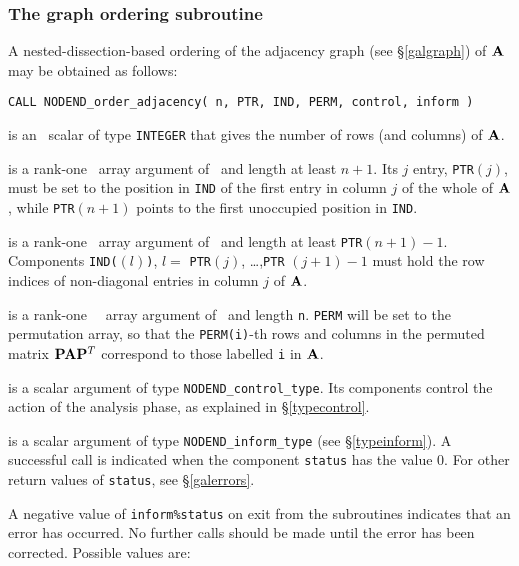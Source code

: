 \documentclass{galahad}
\newcommand{\packagename}{NODEND}
\begin{document}
\subsubsection{The graph ordering subroutine}\label{subgraphorder}
A nested-dissection-based ordering of the adjacency graph (see 
\S\ref{galgraph}) of ${\mathbf{A}}$ may be obtained as follows:
\vskip2mm

\hskip0.5in
{\tt CALL \packagename\_order\_adjacency( n, PTR, IND, PERM, control, inform )}
\begin{description}
 is an \intentin\ scalar of type  {\tt INTEGER} that gives the
number of rows (and columns) of ${\mathbf{A}}$.

 is a rank-one \integer\ array argument of \intentin\ and length 
 at least $n+1$. Its $j$ entry, {\tt PTR}$(j)$, must be set to the position
 in {\tt IND} of the first entry in column $j$ of the whole of ${\mathbf{A}}$,
 while {\tt PTR}$(n+1)$ points to the first unoccupied position in {\tt IND}.

 is a rank-one \integer\ array argument of \intentin\ and length 
 at least  {\tt PTR}$(n+1)-1$. Components
 {\tt IND(}$(l)${\tt )}, $l =$ {\tt PTR}$(j)$, \ldots ,{\tt PTR} $(j+1)-1$
 must hold the row indices of non-diagonal entries in column $j$ of ${\mathbf{A}}$.

 is a rank-one \integer\ \intentout\ array argument
 of \intentout\ and length {\tt n}.
 {\tt PERM} will be set to the permutation array, so that the 
 {\tt PERM(i)}-th rows and columns in the permuted matrix 
 ${\mathbf{P}} {\mathbf{A}} {\mathbf{P}}^T$ correspond to those labelled {\tt i} in ${\mathbf{A}}$.

 is a scalar \intentout argument of type
{\tt \packagename\_control\_type}. Its components control the action
of the analysis phase, as explained in
\S\ref{typecontrol}.

 is a scalar \intentout argument of type
{\tt \packagename\_inform\_type}
(see \S\ref{typeinform}).
A successful call is indicated when the  component {\tt status} has the value 0.
For other return values of {\tt status}, see \S\ref{galerrors}.
\end{description}


\galerrors
A negative value of {\tt inform\%status} on exit from the subroutines
indicates that an error has occurred. No further calls should be made
until the error has been corrected. Possible values are:
\end{document}
